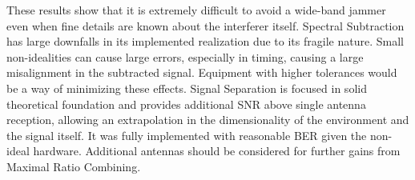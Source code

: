 These results show that it is extremely difficult to avoid a wide-band jammer even when fine details are known about the interferer itself.  Spectral Subtraction has large downfalls in its implemented realization due to its fragile nature.  Small non-idealities can cause large errors, especially in timing, causing a large misalignment in the subtracted signal.  Equipment with higher tolerances would be a way of minimizing these effects.  Signal Separation is focused in solid theoretical foundation and provides additional SNR above single antenna reception, allowing an extrapolation in the dimensionality of the environment and the signal itself.  It was fully implemented with reasonable BER given the non-ideal hardware.  Additional antennas should be considered for further gains from Maximal Ratio Combining.\\




